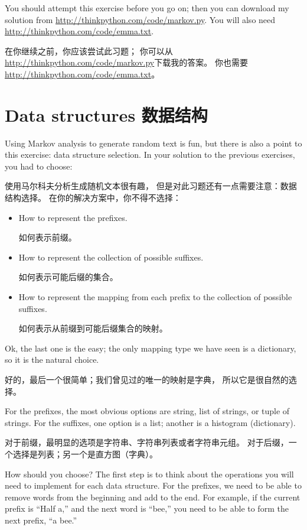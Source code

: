 \documentclass[10pt]{book}
\begin{document}
\begin{CJK}{UTF8}{gbsn}
You should attempt this exercise before you go on; then you can
download my solution from \url{http://thinkpython.com/code/markov.py}.  You
will also need \url{http://thinkpython.com/code/emma.txt}.

在你继续之前，你应该尝试此习题；
你可以从\url{http://thinkpython.com/code/markov.py}下载我的答案。
你也需要\url{http://thinkpython.com/code/emma.txt}。

\section{Data structures 数据结构}

Using Markov analysis to generate random text is fun, but there is
also a point to this exercise: data structure selection.  In your
solution to the previous exercises, you had to choose:

使用马尔科夫分析生成随机文本很有趣，
但是对此习题还有一点需要注意：数据结构选择。
在你的解决方案中，你不得不选择：

\begin{itemize}

\item How to represent the prefixes.

如何表示前缀。

\item How to represent the collection of possible suffixes.

如何表示可能后缀的集合。

\item How to represent the mapping from each prefix to
the collection of possible suffixes.

如何表示从前缀到可能后缀集合的映射。

\end{itemize}

Ok, the last one is the easy; the only mapping type we have
seen is a dictionary, so it is the natural choice.

好的，最后一个很简单；我们曾见过的唯一的映射是字典，
所以它是很自然的选择。

For the prefixes, the most obvious options are string,
list of strings, or tuple of strings.  For the suffixes,
one option is a list; another is a histogram (dictionary).

对于前缀，最明显的选项是字符串、字符串列表或者字符串元组。
对于后缀，一个选择是列表；另一个是直方图（字典）。

How should you choose?  The first step is to think about
the operations you will need to implement for each data structure.
For the prefixes, we need to be able to remove words from
the beginning and add to the end.  For example, if the current
prefix is ``Half a,'' and the next word is ``bee,'' you need
to be able to form the next prefix, ``a bee.''


\end{CJK}
\end{document}
